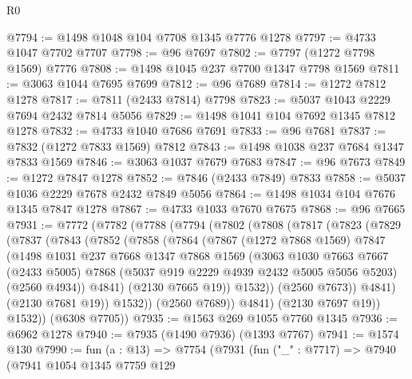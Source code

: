 \begin{lexlean}{R0}
\begin{coremodule}
@7794 := @1498 @1048 @104 @7708 @1345 @7776 @1278
@7797 := @4733 @1047 @7702 @7707
@7798 := @96 @7697
@7802 := @7797 (@1272 @7798 @1569) @7776
@7808 := @1498 @1045 @237 @7700 @1347 @7798 @1569
@7811 := @3063 @1044 @7695 @7699
@7812 := @96 @7689
@7814 := @1272 @7812 @1278
@7817 := @7811 (@2433 @7814) @7798
@7823 := @5037 @1043 @2229 @7694 @2432 @7814 @5056
@7829 := @1498 @1041 @104 @7692 @1345 @7812 @1278
@7832 := @4733 @1040 @7686 @7691
@7833 := @96 @7681
@7837 := @7832 (@1272 @7833 @1569) @7812
@7843 := @1498 @1038 @237 @7684 @1347 @7833 @1569
@7846 := @3063 @1037 @7679 @7683
@7847 := @96 @7673
@7849 := @1272 @7847 @1278
@7852 := @7846 (@2433 @7849) @7833
@7858 := @5037 @1036 @2229 @7678 @2432 @7849 @5056
@7864 := @1498 @1034 @104 @7676 @1345 @7847 @1278
@7867 := @4733 @1033 @7670 @7675
@7868 := @96 @7665
@7931 := @7772
    (@7782
      (@7788
        (@7794
          (@7802
            (@7808
              (@7817
                (@7823
                  (@7829
                    (@7837
                      (@7843
                        (@7852
                          (@7858
                            (@7864
                              (@7867
                                (@1272 @7868 @1569)
                                @7847
                                (@1498
                                  @1031
                                  @237
                                  @7668
                                  @1347
                                  @7868
                                  @1569
                                  (@3063
                                    @1030
                                    @7663
                                    @7667
                                    (@2433 @5005)
                                    @7868
                                    (@5037 @919 @2229 @4939 @2432 @5005 @5056 @5203)
                                    (@2560 @4934))
                                  @4841)
                                (@2130 @7665 @19))
                              @1532))
                          (@2560 @7673))
                        @4841)
                      (@2130 @7681 @19))
                    @1532))
                (@2560 @7689))
              @4841)
            (@2130 @7697 @19))
          @1532))
      (@6308 @7705))
@7935 := @1563 @269 @1055 @7760 @1345
@7936 := @6962 @1278
@7940 := @7935 (@1490 @7936) (@1393 @7767)
@7941 := @1574 @130
@7990 := fun (a : @13) =>
  @7754
    (@7931
      (fun ("_" : @7717) =>
      @7940
        (@7941
          @1054
          @1345
          @7759
          @129

\end{coremodule}
\end{lexlean}
